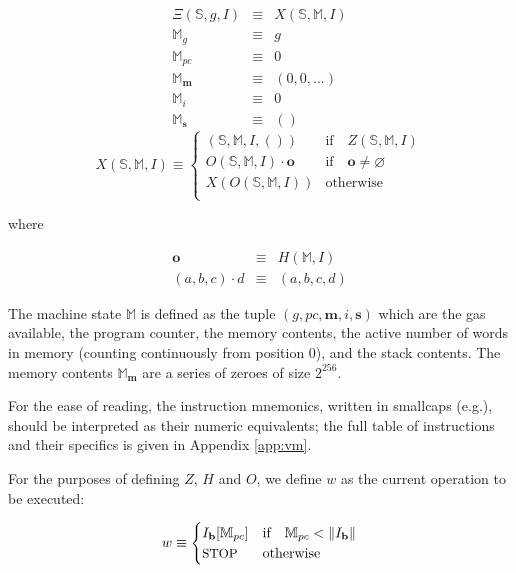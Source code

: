 \documentclass[9pt,oneside]{amsart}
\makeatletter
\newcommand*\eg{e.g.\@\xspace}
\makeatother
\begin{document}
\begin{multicols}{2}
\begin{eqnarray}
\Xi(\mathbb{S}, g, I) & \equiv & X(\mathbb{S}, \mathbb{M}, I) \\
\mathbb{M}_g & \equiv & g \\
\mathbb{M}_{pc} & \equiv & 0 \\
\mathbb{M}_\mathbf{m} & \equiv & (0, 0, ...) \\
\mathbb{M}_i & \equiv & 0 \\
\mathbb{M}_\mathbf{s} & \equiv & ()
\end{eqnarray}
\begin{equation}
X(\mathbb{S}, \mathbb{M}, I) \equiv \begin{cases}
(\mathbb{S}, \mathbb{M}, I, ()) & \text{if} \quad Z(\mathbb{S}, \mathbb{M}, I)\\
O(\mathbb{S}, \mathbb{M}, I) \cdot \mathbf{o} & \text{if} \quad \mathbf{o} \neq \varnothing\\
X(O(\mathbb{S}, \mathbb{M}, I)) & \text{otherwise}\\
\end{cases}
\end{equation}

where

\begin{eqnarray}
\mathbf{o} & \equiv & H(\mathbb{M}, I) \\
(a, b, c) \cdot d & \equiv & (a, b, c, d)
\end{eqnarray}

The machine state $\mathbb{M}$ is defined as the tuple $(g, pc, \mathbf{m}, i, \mathbf{s})$ which are the gas available, the program counter, the memory contents, the active number of words in memory (counting continuously from position 0), and the stack contents. The memory contents $\mathbb{M}_\mathbf{m}$ are a series of zeroes of size $2^{256}$.

For the ease of reading, the instruction mnemonics, written in smallcaps (\eg {}), should be interpreted as their numeric equivalents; the full table of instructions and their specifics is given in Appendix \ref{app:vm}.

For the purposes of defining $Z$, $H$ and $O$, we define $w$ as the current operation to be executed:

\begin{equation}\label{eq:currentoperation}
w \equiv \begin{cases} I_\mathbf{b}[\mathbb{M}_{pc}] & \text{if} \quad \mathbb{M}_{pc} < \lVert I_\mathbf{b} \rVert \\
\text{\small STOP} & \text{otherwise}
\end{cases}
\end{equation}


\end{multicols}
\end{document}
